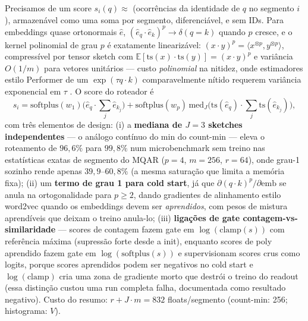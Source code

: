 \documentclass[11pt]{article}
\begin{document}
Precisamos de um score $s_i(q)\approx$ (ocorr\^encias da identidade de $q$ no
segmento $i$), armazen\'avel como uma soma por segmento, diferenci\'avel, e sem
IDs. Para embeddings quase ortonormais $\hat e$,
$(\hat e_q\!\cdot\!\hat e_k)^p\to\delta(q=k)$ quando $p$ cresce, e o kernel
polinomial de grau $p$ \'e exatamente lineariz\'avel:
$(x\!\cdot\!y)^p = \langle x^{\otimes p},y^{\otimes p}\rangle$, compress\'ivel por
tensor sketch \citep{pham2013tensorsketch} com
$\mathbb{E}[\mathrm{ts}(x)\!\cdot\!\mathrm{ts}(y)]=(x\!\cdot\!y)^p$ e vari\^ancia
$O(1/m)$ para vetores unit\'arios --- custo \emph{polinomial} na nitidez, onde
estimadores estilo Performer de um $\exp(\tau q\!\cdot\!k)$ comparavelmente
n\'itido requerem vari\^ancia exponencial em $\tau$
\citep{choromanski2021performer}. O score do roteador \'e
\[
s_i = \mathrm{softplus}(w_1)\big(\hat e_q\!\cdot\!\textstyle\sum_j\hat e_{k_j}\big)
      + \mathrm{softplus}(w_p)\,\mathrm{med}_{J}\!\big(\mathrm{ts}(\hat e_q)\!\cdot\!\textstyle\sum_j\mathrm{ts}(\hat e_{k_j})\big),
\]
com tr\^es elementos de design: (i) a \textbf{mediana de $J=3$ sketches
independentes} --- o an\'alogo cont\'inuo do min do count-min --- eleva o
roteamento de $96{,}6\%$ para $99{,}8\%$ num microbenchmark sem treino nas
estat\'isticas exatas de segmento do MQAR ($p=4$, $m=256$, $r=64$), onde grau-1
sozinho rende apenas $39{,}9$--$60{,}8\%$ (a mesma satura\c{c}\~ao que limita a
mem\'oria fixa); (ii) um \textbf{termo de grau 1 para cold start}, j\'a que
$\partial(q\!\cdot\!k)^p/\partial\mathrm{emb}$ se anula na ortogonalidade para
$p\ge 2$, dando gradientes de alinhamento estilo word2vec quando os embeddings
devem ser \emph{aprendidos}, com pesos de mistura aprend\'iveis que deixam o
treino anula-lo; (iii) \textbf{liga\c{c}\~oes de gate contagem-vs-similaridade}
--- scores de contagem fazem gate em $\log(\mathrm{clamp}(s))$ com refer\^encia
m\'axima (supress\~ao forte desde a init), enquanto scores de poly aprendido fazem
gate em $\log(\mathrm{softplus}(s))$ e supervisionam scores crus como logits,
porque scores aprendidos podem ser negativos no cold start e
$\log(\mathrm{clamp})$ cria uma zona de gradiente morto que destr\'oi o treino do
readout (essa distin\c{c}\~ao custou uma run completa falha, documentada como
resultado negativo). Custo do resumo: $r + J\!\cdot\!m = 832$ floats/segmento
(count-min: 256; histograma: $V$).
\end{document}
